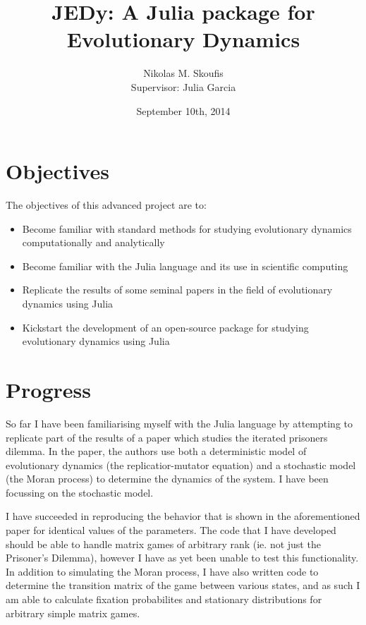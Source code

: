 \documentclass[a4paper,12pt]{article}
\begin{document}
\title{JEDy: A Julia package for Evolutionary Dynamics}
\author{Nikolas M. Skoufis \\ Supervisor: Julia Garcia}
\date{September 10th, 2014}

\maketitle

\section*{Objectives}

The objectives of this advanced project are to:

\begin{itemize}
        
    \item Become familiar with standard methods for studying evolutionary dynamics computationally and analytically
    \item Become familiar with the Julia \cite{julia} language and its use in scientific computing
    \item Replicate the results of some seminal papers in the field of evolutionary dynamics using Julia
    \item Kickstart the development of an open-source package for studying evolutionary dynamics using Julia

\end{itemize}

\section*{Progress}

So far I have been familiarising myself with the Julia language by attempting to replicate part of the results of a paper \cite{imhofetal} which studies the iterated prisoners dilemma.
In the paper, the authors use both a deterministic model of evolutionary dynamics (the replicatior-mutator equation) and a stochastic model (the Moran process) to determine the dynamics of the system.
I have been focussing on the stochastic model.

I have succeeded in reproducing the behavior that is shown in the aforementioned paper for identical values of the parameters.
The code that I have developed should be able to handle matrix games of arbitrary rank (ie. not just the Prisoner's Dilemma), however I have as yet been unable to test this functionality.
In addition to simulating the Moran process, I have also written code to determine the transition matrix of the game between various states, and as such I am able to calculate fixation probabilites and stationary distributions for arbitrary simple matrix games.
\end{document}
